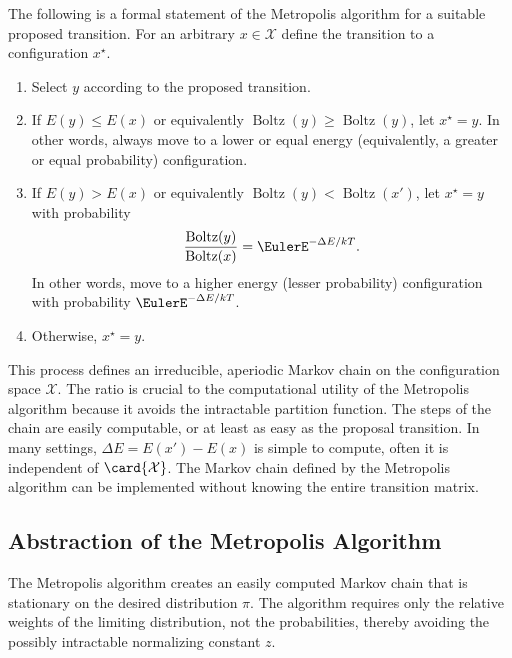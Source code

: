 \documentclass[12pt]{article}
\begin{document}
The following is a formal statement of the Metropolis algorithm for a
suitable proposed transition.  For an arbitrary \( x \in \mathcal{X} \)
define the transition to a configuration \( x^{\star} \).
\begin{enumerate}
    \item
        Select \( y \) according to the proposed transition.
    \item
        If \( E(y) \le E(x) \) or equivalently \(
        \operatorname{Boltz}
        (y) \ge
        \operatorname{Boltz}
        (y) \), let \( x^{\star} = y \).  In other words, always move to
        a lower or equal energy (equivalently, a greater or equal
        probability) configuration.
    \item
        If \( E(y) > E(x) \) or equivalently \(
        \operatorname{Boltz}
        (y) <
        \operatorname{Boltz}
        (x') \), let \( x^{\star} = y \) with probability
        \[
            \frac{%
            \operatorname{Boltz}
            (y)}{%
            \operatorname{Boltz}
            (x)} = \EulerE^{-\Delta E/kT}.
        \] In other words, move to a higher energy (lesser probability)
        configuration with probability \( \EulerE^{-\Delta E/kT} \).
    \item
        Otherwise, \( x^{\star} = y \).
\end{enumerate}
This process defines an irreducible, aperiodic Markov chain on the
configuration space \( \mathcal{X} \).  The ratio is crucial to the
computational utility of the Metropolis algorithm because it avoids the
intractable partition function.  The steps of the chain are easily
computable, or at least as easy as the proposal transition.  In many
settings, \( \Delta E = E(x') - E(x) \) is simple to compute, often it
is independent of \( \card{\mathcal{X}} \).  The Markov chain defined by
the Metropolis algorithm can be implemented without knowing the entire
transition matrix.

\subsection*{Abstraction of the Metropolis Algorithm}

The Metropolis algorithm%
creates an easily computed Markov chain that is stationary on the
desired distribution \( \pi \).  The algorithm requires only the
relative weights of the limiting distribution, not the probabilities,
thereby avoiding the possibly intractable normalizing constant \( z \).
\end{document}
